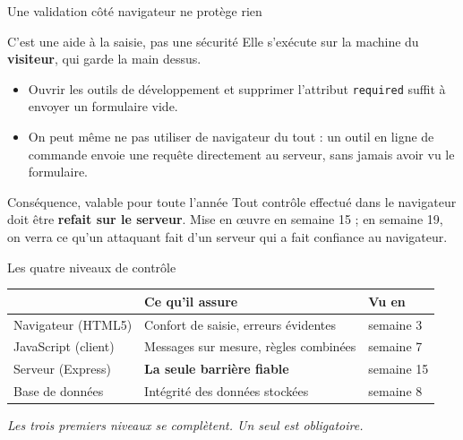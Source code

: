 \documentclass[aspectratio=169,11pt]{beamer}
\newcommand{\hdr}[1]{\multicolumn{1}{l}{\color{white}\bfseries #1}}
\begin{document}
\begin{frame}{Une validation côté navigateur ne protège rien}
  \begin{alertblock}{C'est une aide à la saisie, pas une sécurité}
    Elle s'exécute sur la machine du \textbf{visiteur}, qui garde la main dessus.
    \vspace{0.15cm}

    \begin{itemize}
      \item Ouvrir les outils de développement et supprimer l'attribut \texttt{required} suffit à envoyer un formulaire vide.
      \item On peut même ne pas utiliser de navigateur du tout : un outil en ligne de commande envoie une requête directement au serveur, sans jamais avoir vu le formulaire.
    \end{itemize}
  \end{alertblock}
  \vspace{0.25cm}
  \begin{block}{Conséquence, valable pour toute l'année}
    Tout contrôle effectué dans le navigateur doit être \textbf{refait sur le serveur}. Mise en \oe uvre en semaine 15 ; en semaine 19, on verra ce qu'un attaquant fait d'un serveur qui a fait confiance au navigateur.
  \end{block}
\end{frame}

\begin{frame}{Les quatre niveaux de contrôle}
  \vspace{0.2cm}
  \begin{center}
  \small
  \begin{tabularx}{\textwidth}{lXl}
    \toprule
    \rowcolor{accentBlue}
    \hdr{Niveau} & \hdr{Ce qu'il assure} & \hdr{Vu en} \\
    \midrule
    \rowcolor{cfptGrey}
    Navigateur (HTML5) & Confort de saisie, erreurs évidentes & semaine 3 \\
    JavaScript (client) & Messages sur mesure, règles combinées & semaine 7 \\
    \rowcolor{cfptGrey}
    Serveur (Express) & \textbf{La seule barrière fiable} & semaine 15 \\
    Base de données & Intégrité des données stockées & semaine 8 \\
    \bottomrule
  \end{tabularx}
  \end{center}
  \vspace{0.4cm}
  \begin{center}
    \small\itshape Les trois premiers niveaux se complètent. Un seul est obligatoire.
  \end{center}
\end{frame}
\end{document}
